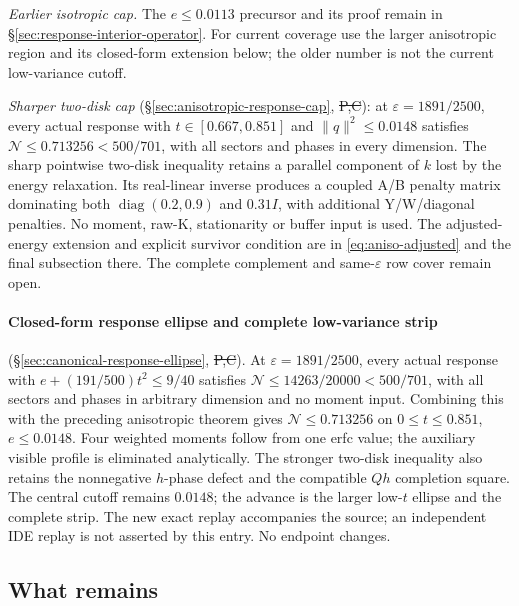 \emph{Earlier isotropic cap.} The $e\le0.0113$ precursor and its proof remain in
\S\ref{sec:response-interior-operator}. For current coverage use the larger
anisotropic region and its closed-form extension below; the older number
is not the current low-variance cutoff.

\emph{Sharper two-disk cap} (\S\ref{sec:anisotropic-response-cap},
\st{P,C}): at $\varepsilon=1891/2500$, every actual response with
$t\in[0.667,0.851]$ and $\|q\|^2\le0.0148$ satisfies
$\mathcal N\le0.713256<500/701$, with all sectors and phases in every
dimension. The sharp pointwise two-disk inequality retains a parallel
component of $k$ lost by the energy relaxation. Its real-linear inverse
produces a coupled A/B penalty matrix dominating both
$\operatorname{diag}(0.2,0.9)$ and $0.31I$, with additional Y/W/diagonal
penalties. No moment, raw-K, stationarity or buffer input is used.
The adjusted-energy extension and explicit survivor condition are in
\eqref{eq:aniso-adjusted} and the final subsection there.
The complete complement and same-$\varepsilon$ row cover remain open.

\paragraph{Closed-form response ellipse and complete low-variance strip}
(\S\ref{sec:canonical-response-ellipse}, \st{P,C}). At
$\varepsilon=1891/2500$, every actual response with
$e+(191/500)t^2\le9/40$ satisfies
$\mathcal N\le14263/20000<500/701$, with all sectors and phases in
arbitrary dimension and no moment input. Combining this with the preceding
anisotropic theorem gives $\mathcal N\le0.713256$ on
$0\le t\le0.851$, $e\le0.0148$. Four weighted moments follow from one
erfc value; the auxiliary visible profile is eliminated analytically.
The stronger two-disk inequality also retains the nonnegative $h$-phase
defect and the compatible $Qh$ completion square. The central cutoff remains
$0.0148$; the advance is the larger low-$t$ ellipse and the complete strip.
The new exact replay accompanies the source; an independent IDE replay is
not asserted by this entry. No endpoint changes.

\subsection{What remains}

